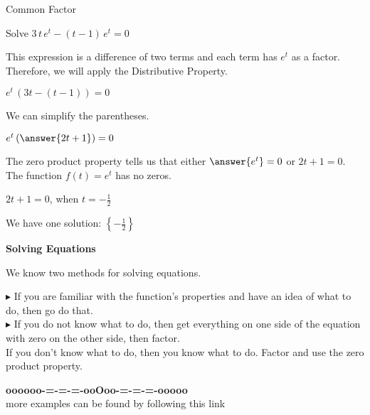 \documentclass{ximera}
\begin{document}
\begin{example} Common Factor


Solve $3 \, t \, e^t - (t-1) \, e^t = 0$

\begin{explanation}



This expression is a difference of two terms and each term has $e^t$ as a factor.  Therefore, we will apply the Distributive Property.



$e^t \, (3t - (t-1))= 0$


We can simplify the parentheses.



$e^t \left( \answer{2t + 1} \right)= 0$



The zero product property tells us that either $\answer{e^t} = 0$ or $2t + 1 = 0$.  \\

The function $f(t) = e^t$ has no zeros. 


$2t + 1 = 0$, when $t = -\frac{1}{2}$

We have one solution: $\left\{ -\frac{1}{2} \right\}$

\end{explanation}
\end{example}







\begin{procedure} \textbf{\textcolor{red!70!black}{Solving Equations}}


We know two methods for solving equations.


\textbf{\textcolor{blue!55!black}{$\blacktriangleright$}} If you are familiar with the function's properties and have an idea of what to do, then go do that. \\


\textbf{\textcolor{blue!55!black}{$\blacktriangleright$}} If you do not know what to do, then get everything on one side of the equation with zero on the other side, then factor. \\



If you don't know what to do, then you know what to do.  Factor and use the zero product property.


\end{procedure}







\begin{center}
\textbf{\textcolor{green!50!black}{oooooo-=-=-=-ooOoo-=-=-=-ooooo}} \\

more examples can be found by following this link\\ 

\end{center}
\end{document}
